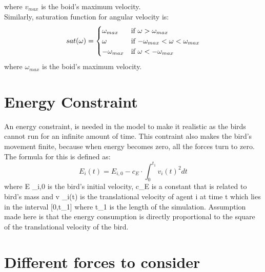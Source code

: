 \documentclass{article}
\begin{document}
where $v_{max}$ is the boid's maximum velocity.\\

Similarly, saturation function for angular velocity is:\\
\begin{equation}
    sat(\omega)=\begin{cases}
    \omega _{max}  & $\text{if $\omega>\omega _{max}$}$\\
    \omega  & $\text{if $-\omega _{max}<\omega<\omega _{max}$}$\\
    -\omega _{max}  & $\text{if $\omega<-\omega _{max}$}$
    \end{cases}
\end{equation}
where $\omega _{max}$ is the boid's maximum velocity.\\

\section{Energy Constraint}
An energy constraint, is needed in the model to make it realistic as the birds cannot run for an infinite amount of time. This contraint also makes the bird's movement finite, because when energy becomes zero, all the forces turn to zero. The formula for this is defined as:
\begin{equation}
E _{i} (t) = E _{i,0} - c _{E} \cdot \int_{0}^{t _{1}} v _{i} (t)^2 dt   
\end{equation}
where E _{i,0} is the bird's initial velocity, c_{E} is a constant that is related to bird's mass and v _{i}(t) is the translational velocity of agent i at time t which lies in the interval [0,t_{1}] where t_{1} is the length of the simulation. Assumption made here is that the energy consumption is directly proportional to the square of the translational velocity of the bird.

\section{Different forces to consider}
\end{document}
